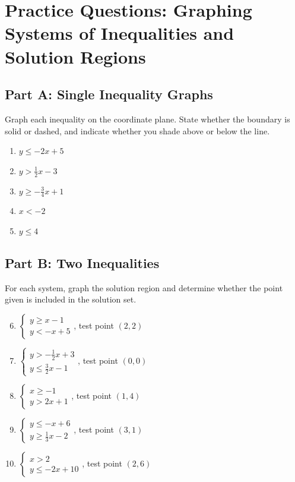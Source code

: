 \documentclass[14pt]{extarticle}
\begin{document}
\newpage


\section*{Practice Questions: Graphing Systems of Inequalities and Solution Regions}

\subsection*{Part A: Single Inequality Graphs}
Graph each inequality on the coordinate plane. State whether the boundary is solid or dashed, and indicate whether you shade above or below the line.
\begin{enumerate}
  \item \(y \le -2x + 5\)
  \item \(y > \tfrac{1}{2}x - 3\)
  \item \(y \ge -\tfrac{3}{4}x + 1\)
  \item \(x < -2\)
  \item \(y \le 4\)
\end{enumerate}

\subsection*{Part B: Two Inequalities}
For each system, graph the solution region and determine whether the point given is included in the solution set.
\begin{enumerate}
  \setcounter{enumi}{5}
  \item \(\begin{cases} y \ge x - 1 \\ y < -x + 5 \end{cases}\), test point \((2,2)\)
  \item \(\begin{cases} y > -\tfrac{1}{2}x + 3 \\ y \le \tfrac{3}{2}x - 1 \end{cases}\), test point \((0,0)\)
  \item \(\begin{cases} x \ge -1 \\ y > 2x + 1 \end{cases}\), test point \((1,4)\)
  \item \(\begin{cases} y \le -x + 6 \\ y \ge \tfrac{1}{3}x - 2 \end{cases}\), test point \((3,1)\)
  \item \(\begin{cases} x > 2 \\ y \le -2x + 10 \end{cases}\), test point \((2,6)\)
\end{enumerate}
\end{document}
